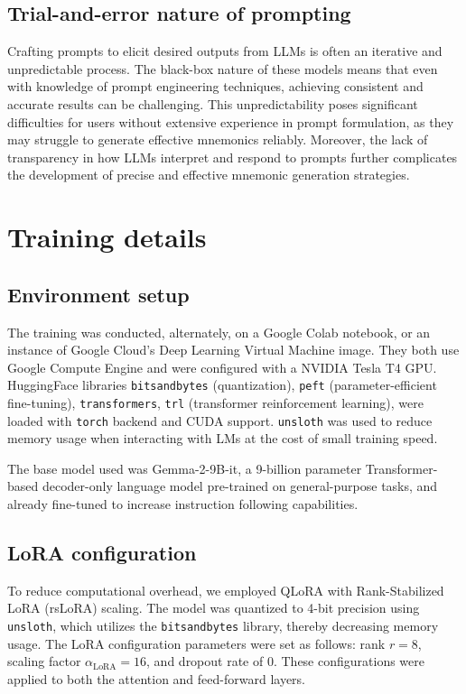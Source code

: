 \documentclass[11pt, onecolumn]{article}
\newcounter{para}
\begin{document}
\subsection{Trial-and-error nature of prompting}

Crafting prompts to elicit desired outputs from LLMs is often an iterative and unpredictable process. The black-box nature of these models means that even with knowledge of prompt engineering techniques, achieving consistent and accurate results can be challenging. This unpredictability poses significant difficulties for users without extensive experience in prompt formulation, as they may struggle to generate effective mnemonics reliably. Moreover, the lack of transparency in how LLMs interpret and respond to prompts further complicates the development of precise and effective mnemonic generation strategies.

\section{Training details} \label{sec:training-details}
\subsection{Environment setup}
The training was conducted, alternately, on a Google Colab notebook, or an instance of Google Cloud's Deep Learning Virtual Machine image. They both use Google Compute Engine and were configured with a NVIDIA Tesla T4 GPU. HuggingFace libraries \verb|bitsandbytes| (quantization), \verb|peft| (parameter-efficient fine-tuning), \verb|transformers|, \verb|trl| (transformer reinforcement learning), were loaded with \verb|torch| backend and CUDA support. \verb|unsloth| was used to reduce memory usage when interacting with LMs at the cost of small training speed.

The base model used was Gemma-2-9B-it, a 9-billion parameter Transformer-based decoder-only language model pre-trained on general-purpose tasks, and already fine-tuned to increase instruction following capabilities.

\subsection{LoRA configuration}

To reduce computational overhead, we employed QLoRA with Rank-Stabilized LoRA (rsLoRA) scaling. The model was quantized to 4-bit precision using \texttt{unsloth}, which utilizes the \texttt{bitsandbytes} library, thereby decreasing memory usage. The LoRA configuration parameters were set as follows: rank \( r = 8 \), scaling factor \( \alpha_{\text{LoRA}} = 16 \), and dropout rate of 0. These configurations were applied to both the attention and feed-forward layers.
\end{document}
